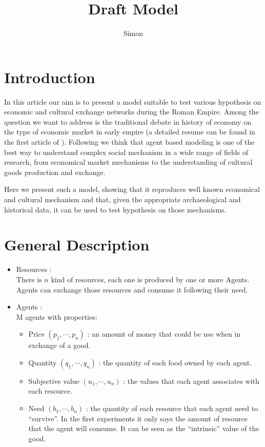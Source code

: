 \documentclass[a4paper]{article}
\title{Draft Model}
\author{Simon}
\begin{document}
\maketitle


\section{Introduction}
In this article our aim is to present a model suitable to test various hypothesis on economic and cultural exchange networks during the Roman Empire. Among the question we want to address is the traditional debate in history of economy on the type of economic market in early empire (a detailed resume can be found in the first article of \cite{polanyi1957tradeandmarketintheearlyempireseconomiesinhistoryandtheory}). Following \cite{epstein1996growingartificialsocietiessocialsciencefromthebottomup,lake2014trendsinarchaeologicalsimulation,kohler2000dynamicsinhumanandprimatesocietiesagentbasedmodelingofsocialandspatialprocesses,tesfatsion2003agentbasedcomputationaleconomicsmodelingeconomiesascomplexadaptivesystems} we think that agent based modeling is one of the best way to understand complex social mechanism in a wide range of fields of research, from economical market mechanisms to the understanding of cultural goods production and exchange.

Here we present such a model, showing that it reproduces well known economical and cultural mechanism and that, given the appropriate archaeological and historical data, it can be used to test hypothesis on those mechanisms.

\section{General Description} 
\begin{itemize}
	\item Resources :\\
		There is $n$ kind of resources, each one is produced by one or more Agents. Agents can exchange those resources and consume it following their need.
	\item  Agents :\\
		M agents with properties:
		\begin{itemize}
			\item Price $(p_1,\cdots,p_n)$ : an amount of money that could be use when in exchange of a good.
			\item Quantity $(q_1,\cdots,q_n)$ : the quantity of each food owned by each agent.
			\item Subjective value $(u_1,\cdots,u_n)$ : the values that each agent associates with each resource.
			\item Need $(b_1, \cdots, b_n)$ :  the quantity of each resource that each agent need to ``survive''. In the first experiments it only says the amount of resource that the agent will consume. It can be seen as the ``intrinsic'' value of the good.
		\end{itemize}
\end{itemize}
\end{document}
